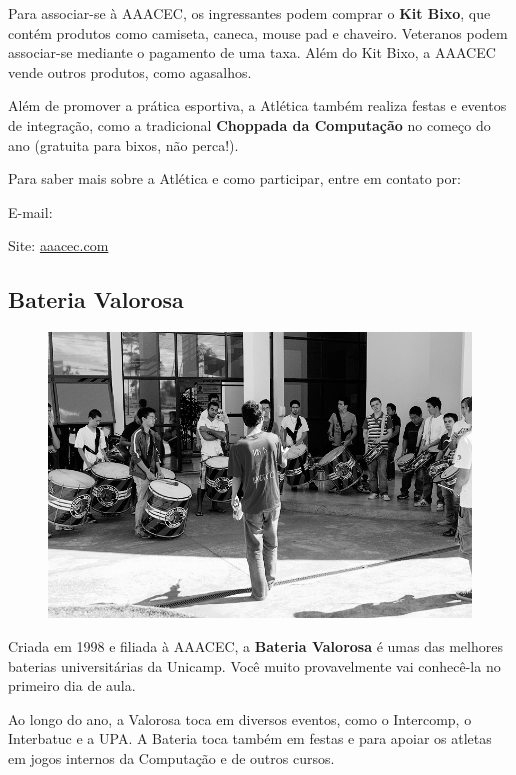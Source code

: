 Para associar-se à AAACEC, os ingressantes podem comprar o \textbf{Kit Bixo}, que contém
produtos como camiseta, caneca, mouse pad e chaveiro. Veteranos podem
associar-se mediante o pagamento de uma taxa. Além do Kit Bixo, a AAACEC vende
outros produtos, como agasalhos.

Além de promover a prática esportiva, a Atlética também realiza festas e eventos
de integração, como a tradicional \textbf{Choppada da Computação} no começo do
ano (gratuita para bixos, não perca!).

Para saber mais sobre a Atlética e como participar, entre em contato por:

\begin{compactitemize}
\item  E-mail: 
\item  Site: \url{aaacec.com}
\end{compactitemize}

\subsection{Bateria Valorosa}

\begin{figure}[H]
    \centering
    \includegraphics[scale=0.27]{img/valorosa_foto.jpg}
\end{figure}

Criada em 1998 e filiada à AAACEC, a \textbf{Bateria Valorosa} é umas das
melhores baterias universitárias da Unicamp. Você muito provavelmente vai
conhecê-la no primeiro dia de aula.

Ao longo do ano, a Valorosa toca em diversos eventos, como o Intercomp,
o Interbatuc e a UPA. A Bateria toca também em festas e para apoiar os atletas
em jogos internos da Computação e de outros cursos.

